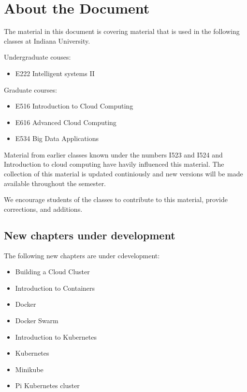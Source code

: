 \section{About the Document}\label{about-the-document}

The material in this document is covering material that is used in the
following classes at Indiana University.

Undergraduate couses:

\begin{itemize}
\tightlist
\item E222 Intelligent systems II
\end{itemize}

Graduate courses:

\begin{itemize}
\tightlist
\item E516 Introduction to Cloud Computing
\item E616 Advanced Cloud Computing
\item E534 Big Data Applications
\end{itemize}

Material from earlier classes known under the numbers I523 and I524 and
Introduction to cloud computing have havily influenced this material.
The collection of this material is updated continiously and new versions
will be made available throughout the semester.

We encourage students of the classes to contribute to this material,
provide corrections, and additions.

\subsection{New chapters under
development}\label{new-chapters-under-development}

The following new chapters are under cdevelopment:

\begin{itemize}
\item Building a Cloud Cluster
\item Introduction to Containers
\item Docker
\item Docker Swarm
\item Introduction to Kubernetes
\item Kubernetes
\item Minikube
\item Pi Kubernetes cluster
\end{itemize}

